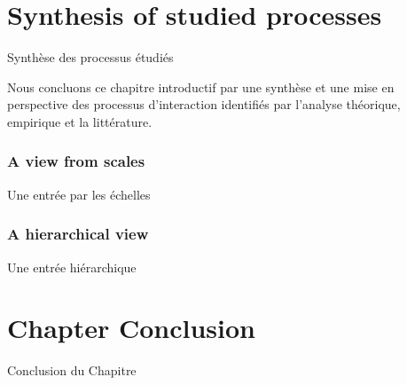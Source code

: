 


\newpage

\section*{Synthesis of studied processes}{Synthèse des processus étudiés}


Nous concluons ce chapitre introductif par une synthèse et une mise en perspective des processus d'interaction identifiés par l'analyse théorique, empirique et la littérature.


\subsubsection*{A view from scales}{Une entrée par les échelles}



\subsubsection*{A hierarchical view}{Une entrée hiérarchique}












\newpage


\section*{Chapter Conclusion}{Conclusion du Chapitre}


